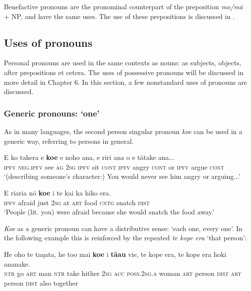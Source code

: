 Benefactive pronouns are the pronominal counterpart of the preposition \textit{mo/mā} + NP, and have the same uses. The use of these prepositions is discussed in .

\subsection{Uses of pronouns}\label{sec:4.2.4}

Personal pronouns are used in the same contexts as nouns: as subjects, objects, after prepositions et cetera. The uses of possessive pronouns will be discussed in more detail in Chapter 6. In this section, a few nonstandard uses of pronouns are discussed.

\subsubsection[Generic pronouns: ‘one’]{Generic pronouns: ‘one’}\label{sec:4.2.4.1}

As in many languages, the second person singular pronoun \textit{koe} can be used in a generic way, referring to persons in general. 

\ea\label{ex:4.3}
\gll E ko takera e \textbf{koe} e noho {\ꞌ}ana, e riri {\ꞌ}ana {\ꞌ}o e tātake {\ꞌ}ana... \\
\textsc{ipfv} \textsc{neg.ipfv} see \textsc{ag} \textsc{2sg} \textsc{ipfv} sit \textsc{cont} \textsc{ipfv} angry \textsc{cont} or \textsc{ipfv} argue \textsc{cont} \\

\glt 
‘(describing someone’s character:) You would never see him angry or arguing...’ \textstyleExampleref{[R302.050]} 
\z

\ea\label{ex:4.4}
\gll E ri{\ꞌ}ari{\ꞌ}a nō \textbf{koe} {\ꞌ}i te kai ka hiko era. \\
\textsc{ipfv} afraid just \textsc{2sg} at \textsc{art} food \textsc{cntg} snatch \textsc{dist} \\

\glt
‘People (lit. you) were afraid because she would snatch the food away.’ \textstyleExampleref{[R368.104]} 
\z

\textit{Koe} as a generic pronoun can have a distributive sense: ‘each one, every one’. In the following example this is reinforced by the repeated \textit{te kope era} ‘that person’:

\ea\label{ex:4.5}
\gll He oho te taŋata, he to{\ꞌ}o mai \textbf{koe} i \textbf{tā{\ꞌ}au} vi{\ꞌ}e, te kope era, te kope era hoki ananake.\\
\textsc{ntr} go \textsc{art} man \textsc{ntr} take hither \textsc{2sg} \textsc{acc} \textsc{poss.2sg.a} woman \textsc{art} person \textsc{dist} \textsc{art} person \textsc{dist} also together\\

